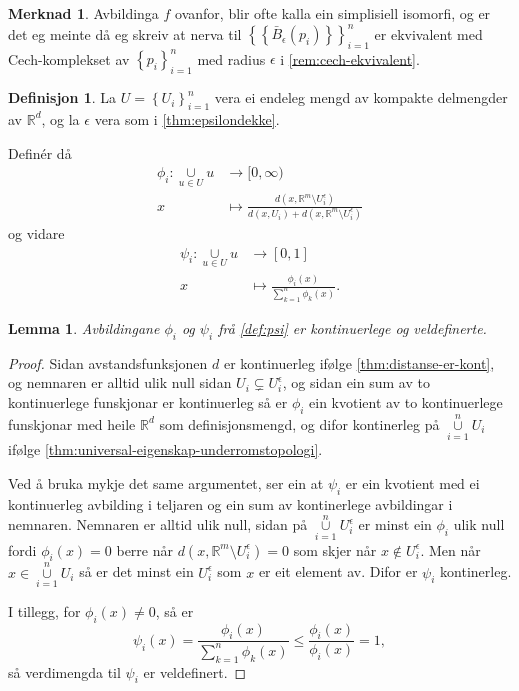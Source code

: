\documentclass[a4paper, 12pt, norsk]{article}
\theoremstyle{plain}
\newtheorem{lemma}[theorem]{Lemma}
\theoremstyle{definition}
\newtheorem{definition}[theorem]{Definisjon}
\newtheorem{remark}[theorem]{Merknad}
\newcommand{\Rb}{\mathbb{R}}
\newcommand{\union}{ \mathop{\cup}\limits }
\newcommand{\set}[1]{ \left\{ #1 \right\} } %
\begin{document}
\begin{remark}
	Avbildinga \( f \) ovanfor, blir ofte kalla ein simplisiell isomorfi, og er det eg meinte då eg skreiv at nerva til \( \set{\set{\bar{B}_\epsilon(p_i)}}_{i=1}^n \) er ekvivalent med Cech-komplekset av \( \set{p_i}_{i=1}^n \) med radius \( \epsilon \) i \autoref{rem:cech-ekvivalent}.
\end{remark}

\begin{definition} \label{def:psi}
	La \( U = \set{U_i}_{i=1}^n \) vera ei endeleg mengd av kompakte delmengder av \( \Rb^d \), og la \( \epsilon \) vera som i \autoref{thm:epsilondekke}.

	Definér då
	\begin{align*}
		\phi_i : \union_{u \in U} u &\to [0, \infty) \\
		x &\mapsto \frac{d(x, \Rb^m \setminus U_i^\epsilon)}{d(x, U_i) + d(x, \Rb^m \setminus U_i^\epsilon)}
	\end{align*}
	og vidare
	\begin{align*}
		\psi_i : \union_{u \in U} u &\to [0, 1] \\
		x &\mapsto \frac{\phi_i(x)}{\sum_{k=1}^n \phi_k(x)}.
	\end{align*}
\end{definition}

\begin{lemma}
	Avbildingane \( \phi_i \) og \( \psi_i \) frå \autoref{def:psi} er kontinuerlege og veldefinerte.
\end{lemma}

\begin{proof} 
	Sidan avstandsfunksjonen \( d \) er kontinuerleg ifølge \autoref{thm:distanse-er-kont}, og nemnaren er alltid ulik null sidan \( U_i \subsetneq U_i^\epsilon \), og sidan ein sum av to kontinuerlege funskjonar er kontinuerleg så er \( \phi_i \) ein kvotient av to kontinuerlege funskjonar med heile \( \Rb^d \) som definisjonsmengd, og difor kontinerleg på \( \union_{i=1}^n U_i \) ifølge \autoref{thm:universal-eigenskap-underromstopologi}.

	Ved å bruka mykje det same argumentet, ser ein at \( \psi_i \) er ein kvotient med ei kontinuerleg avbilding i teljaren og ein sum av kontinerlege avbildingar i nemnaren. Nemnaren er alltid ulik null, sidan på \( \union_{i=1}^n U_i^\epsilon \) er minst ein \( \phi_i \) ulik null fordi \( \phi_i(x)=0 \) berre når \( d(x, \Rb^m \setminus U_i^\epsilon)=0 \) som skjer når \( x \not\in U_i^\epsilon \). Men når \( x \in \union_{i=1}^n U_i \) så er det minst ein \( U_i^\epsilon \) som \( x \) er eit element av. Difor er \( \psi_i \) kontinerleg.

	I tillegg, for \( \phi_i(x) \neq 0 \), så er
	\[
		\psi_i(x) = \frac{\phi_i(x)}{\sum_{k=1}^n \phi_k(x)} \leq \frac{\phi_i(x)}{\phi_i(x)} = 1,
	\]
	så verdimengda til \( \psi_i \) er veldefinert.
\end{proof}
\end{document}
